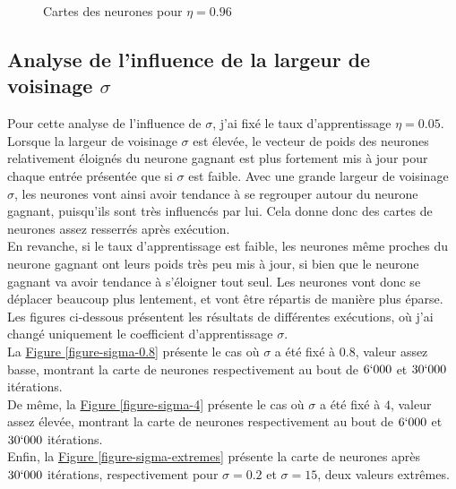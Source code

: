 \documentclass{article}
\begin{document}
\begin{figure}[H]
    \centering
    \hypertarget{figure-eta-0.96}{}
    \caption{Cartes des neurones pour $\eta = 0.96$}
    \label{figure-eta-0.96}
\end{figure}

\subsection{Analyse de l'influence de la largeur de voisinage $\sigma$}

Pour cette analyse de l'influence de $\sigma$, j'ai fixé le taux d'apprentissage $\eta = 0.05$.\\
Lorsque la largeur de voisinage $\sigma$ est élevée, le vecteur de poids des neurones relativement éloignés du neurone gagnant est plus fortement mis à jour pour chaque entrée présentée que si $\sigma$ est faible. Avec une grande largeur de voisinage $\sigma$, les neurones vont ainsi avoir tendance à se regrouper autour du neurone gagnant, puisqu'ils sont très influencés par lui. Cela donne donc des cartes de neurones assez resserrés après exécution.\\
En revanche, si le taux d'apprentissage est faible, les neurones même proches du neurone gagnant ont leurs poids très peu mis à jour, si bien que le neurone gagnant va avoir tendance à s'éloigner tout seul. Les neurones vont donc se déplacer beaucoup plus lentement, et vont être répartis de manière plus éparse.\\
Les figures ci-dessous présentent les résultats de différentes exécutions, où j'ai changé uniquement le coefficient d'apprentissage $\sigma$.\\
La \hyperlink{figure-sigma-0.8}{Figure \ref{figure-sigma-0.8}} présente le cas où $\sigma$ a été fixé à $0.8$, valeur assez basse, montrant la carte de neurones respectivement au bout de $6`000$ et $30`000$ itérations. \\
De même, la \hyperlink{figure-sigma-4}{Figure \ref{figure-sigma-4}} présente le cas où $\sigma$ a été fixé à $4$, valeur assez élevée, montrant la carte de neurones respectivement au bout de $6`000$ et $30`000$ itérations. \\
Enfin, la \hyperlink{figure-sigma-extremes}{Figure \ref{figure-sigma-extremes}} présente la carte de neurones après $30`000$ itérations, respectivement pour $\sigma = 0.2$ et $\sigma = 15$, deux valeurs extrêmes.\\
\end{document}

